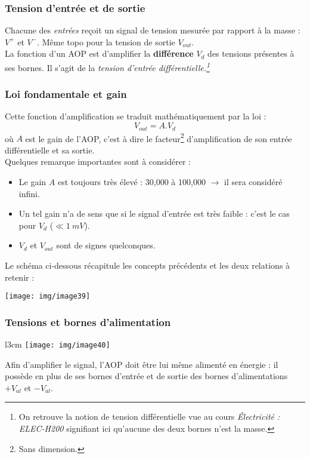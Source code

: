 \subsubsection{Tension d'entrée et de sortie}
Chacune des \textit{entrées} reçoit un signal de tension mesurée par rapport à la masse : $V^+$ et $V^-$. Même topo pour la tension de sortie $V_{out}$.\\
La fonction d'un AOP est d'amplifier la \textbf{différence} $V_d$ des tensions présentes à ses bornes. Il s'agit de la \textit{tension d'entrée différentielle.\footnote{On retrouve la notion de tension différentielle vue au cours \textit{Électricité : ELEC-H200} signifiant ici qu'aucune des deux bornes n'est la masse.}}

\subsubsection{Loi fondamentale et gain}
Cette fonction d'amplification se traduit mathématiquement par la loi : 
\begin{equation}
	V_{out} = A.V_d
\end{equation}
où $A$ est le gain de l'AOP, c'est à dire le facteur\footnote{Sans dimension.} d'amplification de son entrée différentielle et sa sortie.\\
Quelques remarque importantes sont à considérer :
\begin{itemize}
	\item Le gain $A$ est toujours très élevé : 30,000 à 100,000 $\rightarrow$ il sera considéré infini.
	\item Un tel gain n'a de sens que si le signal d'entrée est très faible : c'est le cas pour $V_d$ ($\ll 1\ mV$).
	\item $V_d$ et $V_{out}$ sont de signes quelconques.
\end{itemize}
Le schéma ci-dessous récapitule les concepts précédents et les deux relations à retenir :
\begin{center}
	\texttt{[image: img/image39]}
\end{center}


\subsubsection{Tensions et bornes d'alimentation}
\begin{wrapfigure}[8]{l}{3cm}
	\texttt{[image: img/image40]}
\end{wrapfigure}
Afin d'amplifier le signal, l'AOP doit être lui même alimenté en énergie : il possède en plus de ses bornes d'entrée et de sortie des bornes d'alimentations $+V_{al}$ et $-V_{al}$. \\

